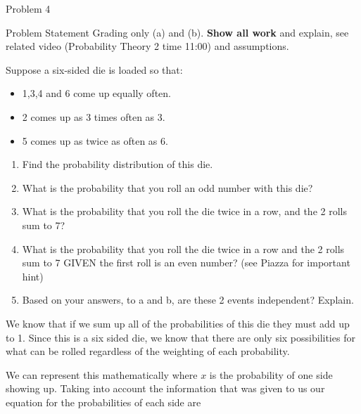 \begin{problem}{Problem 4}
    \begin{statement}{Problem Statement}
        Grading only (a) and (b). \textbf{Show all work} and explain, see related video (Probability Theory 2 time 11:00) and assumptions. \vspace*{1em}

        Suppose a six-sided die is loaded so that:

        \begin{itemize}
            \item 1,3,4 and 6 come up equally often.
            \item 2 comes up as 3 times often as 3.
            \item 5 comes up as twice as often as 6.
        \end{itemize}

        \begin{enumerate}[label = (\alph*)]
            \item Find the probability distribution of this die.
            \item What is the probability that you roll an odd number with this die?
            \item What is the probability that you roll the die twice in a row, and the 2 rolls sum to 7?
            \item What is the probability that you roll the die twice in a row and the 2 rolls sum to 7 GIVEN the first roll is an even number? (see Piazza for important hint)
            \item Based on your answers, to a and b, are these 2 events independent? Explain.
        \end{enumerate}
    \end{statement}

    \begin{Highlight}
        We know that if we sum up all of the probabilities of this die they must add up to 1. Since this is a six sided die, we know that there are only six possibilities for what can be rolled regardless
        of the weighting of each probability.

        We can represent this mathematically where $x$ is the probability of one side showing up. Taking into account the information that was given to us our equation for the probabilities of each side
        are


\end{Highlight}
\end{problem}
